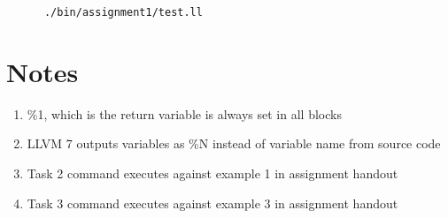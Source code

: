 \documentclass[11pt,a4paper,fleqn]{article}
\begin{document}
   \begin{verbatim}
      ./bin/assignment1/test.ll
   \end{verbatim}

   \section{Notes}

   \begin{enumerate}
      \item \%1, which is the return variable is always set in all blocks
      \item LLVM 7 outputs variables as \%N instead of variable name from source code
      \item Task 2 command executes against example 1 in assignment handout
      \item Task 3 command executes against example 3 in assignment handout
   \end{enumerate}
   
\end{document}
